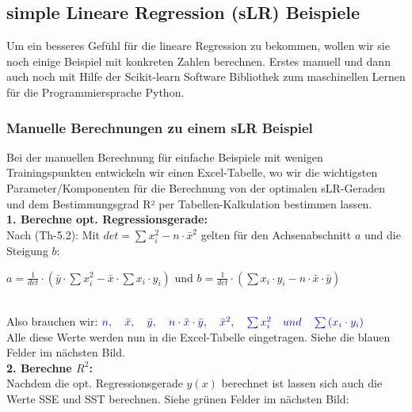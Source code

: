 \documentclass[12pt]{article}
\begin{document}
\subsection{simple Lineare Regression (sLR) Beispiele}

Um ein besseres Gefühl für die lineare Regression zu bekommen, wollen wir sie noch einige Beispiel mit konkreten Zahlen berechnen. Erstes manuell und dann auch noch mit Hilfe der Scikit-learn Software Bibliothek zum maschinellen Lernen für die Programmiersprache Python.
\subsubsection{Manuelle Berechnungen zu einem sLR Beispiel}
%
Bei der manuellen Berechnung für einfache Beispiele mit wenigen  Trainingspunkten entwickeln wir einen Excel-Tabelle, wo wir die wichtigsten Parameter/Komponenten für die Berechnung von der optimalen sLR-Geraden und dem Bestimmungsgrad R² per Tabellen-Kalkulation bestimmen lassen.\\

\textbf{1. Berechne opt. Regressionsgerade:}\\[0.2cm]   
Nach (Th-5.2): Mit $ det = \sum{x_i^2} - n \cdot \bar{x}^2 $ gelten für den Achsenabschnitt $a$ und die Steigung $b$:\\[0.2cm]
\begin{large}
$ a = \frac{1}{det} \cdot (\bar{y} \cdot \sum{x_i^2} - \bar{x} \cdot \sum{x_i \cdot y_i}) $ und $ b = \frac{1}{det} \cdot (\sum {x_i \cdot y_i} - n \cdot \bar{x} \cdot \bar{y})$   \\[0.2cm]
\end{large} \\[0.2cm]
Also brauchen wir: ${\color{blue}{ n, \quad \bar{x}, \quad \bar{y}, \quad n \cdot \bar{x} \cdot \bar{y}, \quad \bar{x}^2, \quad \sum{x_i^2} \quad und \quad \sum{(x_i \cdot y_i)}}}$
\\[0.2cm]
Alle diese Werte werden nun in die Excel-Tabelle eingetragen. Siehe die blauen Felder im nächsten Bild.\\[0.1cm]

\textbf{2. Berechne $R^2$:}\\[0.2cm]
Nachdem die opt. Regressionsgerade $y(x)$ berechnet ist lassen sich auch die  Werte SSE und SST berechnen. Siehe grünen Felder im nächsten Bild:\\
\\[1.5cm]
\end{document}
